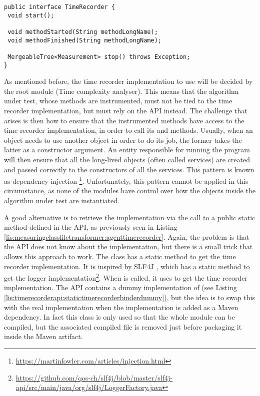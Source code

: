 \begin{lstlisting}[breaklines,caption={TimeRecorder interface},label=lis:timerecorderapi:timerecorderinterface]
public interface TimeRecorder {
 void start();

 void methodStarted(String methodLongName);
 void methodFinished(String methodLongName);

 MergeableTree<Measurement> stop() throws Exception;
}
\end{lstlisting}

\noindent As mentioned before, the time recorder implementation to use will be decided by the root module (Time complexity analyser). This means that  the algorithm under test, whose methods are instrumented, must not be tied to the time recorder implementation, but must rely on the API instead. The challenge that arises is then how to ensure that the instrumented methods have access to the time recorder implementation, in order to call its  and  methods. Usually, when an object needs to use another object in order to do its job, the former takes the latter as a constructor argument. An entity responsible for running the program will then ensure that all the long-lived objects (often called services) are created and passed correctly to the constructors of all the services. This pattern is known as dependency injection \footnote{\url{https://martinfowler.com/articles/injection.html}}. Unfortunately, this pattern cannot be applied in this circumstance, as none of the modules have control over how the objects inside the algorithm under test are instantiated.

\noindent A good alternative is to retrieve the implementation via the call to a public static method defined in the API, as previously seen in Listing \ref{lis:measuringclassfiletransformer:agenttimerecorder}. Again, the problem is that the API does not know about the implementation, but there is a small trick that allows this approach to work. The class  has a static method  to get the time recorder implementation. It is inspired by SLF4J , which has a static method  to get the logger implementation\footnote{\url{https://github.com/qos-ch/slf4j/blob/master/slf4j-api/src/main/java/org/slf4j/LoggerFactory.java}}. When  is called, it uses  to get the time recorder implementation. The API contains a dummy implementation of  (see Listing \ref{lis:timerecorderapi:statictimerecorderbinderdummy}), but the idea is to swap this with the real implementation when the implementation is added as a Maven dependency. In fact this class is only used so that the whole module can be compiled, but the associated compiled  file is removed just before packaging it inside the Maven artifact.

